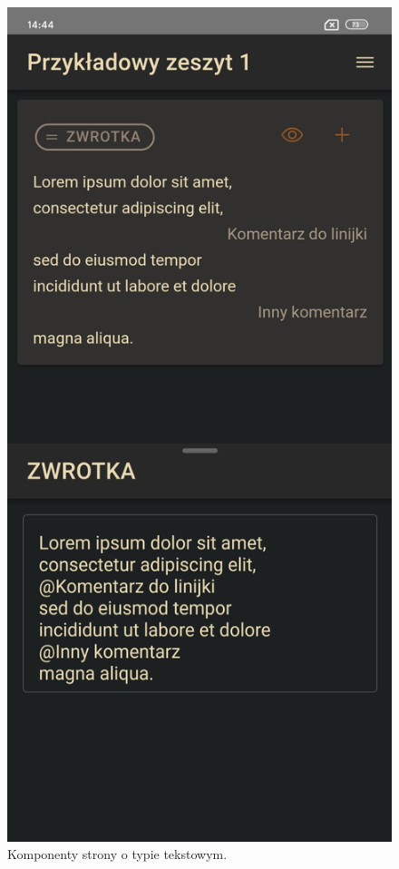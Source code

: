 \begin{figure}[H]
	\begin{center}
		\includegraphics[scale=0.2]{media/TextPage.jpg}
	\end{center}
	\caption{Komponenty strony o typie tekstowym.}
	\label{rys:text-page}
\end{figure}

